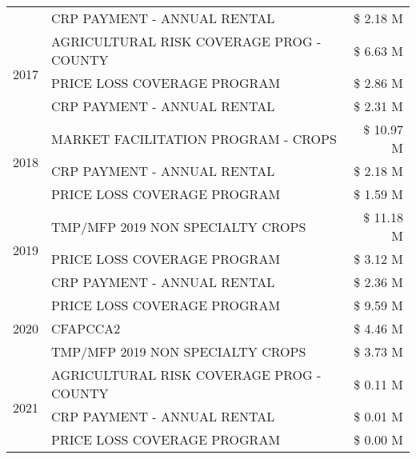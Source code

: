 \begin{tabular}{llr}
 & CRP PAYMENT - ANNUAL RENTAL & \$ 2.18 M \\
\cline{1-3}
\multirow[t]{3}{*}{2017} & AGRICULTURAL RISK COVERAGE PROG - COUNTY & \$ 6.63 M \\
 & PRICE LOSS COVERAGE PROGRAM & \$ 2.86 M \\
 & CRP PAYMENT - ANNUAL RENTAL & \$ 2.31 M \\
\cline{1-3}
\multirow[t]{3}{*}{2018} & MARKET FACILITATION PROGRAM - CROPS & \$ 10.97 M \\
 & CRP PAYMENT - ANNUAL RENTAL & \$ 2.18 M \\
 & PRICE LOSS COVERAGE PROGRAM & \$ 1.59 M \\
\cline{1-3}
\multirow[t]{3}{*}{2019} & TMP/MFP 2019 NON SPECIALTY CROPS & \$ 11.18 M \\
 & PRICE LOSS COVERAGE PROGRAM & \$ 3.12 M \\
 & CRP PAYMENT - ANNUAL RENTAL & \$ 2.36 M \\
\cline{1-3}
\multirow[t]{3}{*}{2020} & PRICE LOSS COVERAGE PROGRAM & \$ 9.59 M \\
 & CFAPCCA2 & \$ 4.46 M \\
 & TMP/MFP 2019 NON SPECIALTY CROPS & \$ 3.73 M \\
\cline{1-3}
\multirow[t]{3}{*}{2021} & AGRICULTURAL RISK COVERAGE PROG - COUNTY & \$ 0.11 M \\
 & CRP PAYMENT - ANNUAL RENTAL & \$ 0.01 M \\
 & PRICE LOSS COVERAGE PROGRAM & \$ 0.00 M \\
\cline{1-3}
\bottomrule
\end{tabular}
